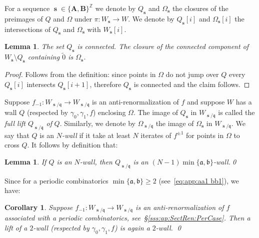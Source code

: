 \documentclass[]{amsart}
\newcommand\seq{{\operatorname{\mathbf s}}}
\renewcommand{\aa}{{\mathfrak{a}}}
\newcommand{\bb}{{\mathfrak{b}}}
\renewcommand{\qq}{\mathfrak{q}}
\newcommand{\A}{\mathbf A}
\newcommand{\B}{\mathbf B}
\newcommand\wall{{Q}}
\newcommand\inn{{\Omega}}
\newcommand{\Z}{\mathbb{Z}}
\newtheorem{cor}[thm]{Corollary}
\newtheorem{lem}[thm]{Lemma}
\theoremstyle{remark}
\numberwithin{equation}{section}
\theoremstyle{definition}
\begin{document}
For a sequence $\seq\in \{\A,\B\}^\Z$ we denote by $\wall_\seq$ and $\inn_\seq$ the closures of the preimages of $\wall$ and $\inn$ under $\pi\colon W_\seq\to W$.  We denote by $\wall_\seq[i]$ and $\inn_\seq[i]$ the intersections of $\wall_\seq$ and $\inn_\seq$ with $W_\seq[i]$. %

\begin{lem}
The set $\wall_\seq$ is connected. The closure of the connected component of $W_\seq\setminus \wall_\seq$ containing $\widetilde 0$ is $\inn_\seq$.
\end{lem}
\begin{proof}
Follows from the definition: since points in $\inn$ do not jump over $\wall$ every  $\wall_\seq[i]$ intersects $\wall_\seq[i+1]$, therefore $\wall_\seq$ is connected and the claim follows.  
\end{proof}

 
Suppose $f_{-1}\colon W_{\seq/\qq}\to W_{\seq/\qq}$ is an anti-renormalization of $f$ and suppose $W$ has a wall $\wall$ (respected by $\gamma_0,\gamma_1,f$) enclosing $\inn$. The image of $\wall_\seq$ in $W_{\seq/\qq}$ is called the \emph{full lift $\wall_{\seq/\qq}$ of} $\wall$. Similarly, we denote by $\inn_{\seq/\qq}$ the image of $\inn_\seq$ in  $W_{\seq/\qq}$. We say that $\wall$ is an \emph{$N$-wall} if it take at least $N$ iterates of $f^{\pm1}$ for points in $\inn$ to cross $\wall$. It follows by definition that:
\begin{lem}
\label{lem:ap:full lift of wall}
If $\wall$ is an \emph{$N$-wall}, then  $\wall_{\seq/\qq}$ is an $(N-1)\min \{\aa,\bb\}$-wall.\qed
\end{lem} 


Since for a periodic combinatorics $\min \{\aa,\bb\}\ge 2$ (see~\eqref{eq:app:aa1 bb1}), we have: 
\begin{cor}
\label{cor:lift of 2wall is 2wall}
Suppose $f_{-1}\colon W_{\seq/\qq}\to W_{\seq/\qq}$ is an anti-renormalization of $f$ associated with a periodic combinatorics, see~\S\ref{sss:ap:SectRen:PerCase}. Then a lift of a $2$-wall  (respected by $\gamma_0,\gamma_1,f$) is again a $2$-wall. \qed
\end{cor}
\end{document}
